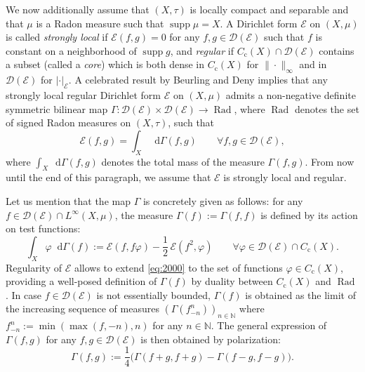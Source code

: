 \documentclass[10pt]{amsart}
\newcommand{\rmc}{\mathrm{c}}
\theoremstyle{plain}
\theoremstyle{definition}
\newcommand{\setN}{\mathbb{N}}
\newcommand{\cE}{\mathcal{E}}
\newcommand{\cD}{\mathcal{D}}
\let\phi\varphi
\DeclareMathOperator{\Rad}{Rad}
\newcommand{\di}{\mathop{}\!\mathrm{d}}
\DeclareMathOperator{\supp}{supp}
\begin{document}
We now additionally assume that $(X,\tau)$ is locally compact and separable and that $\mu$ is a Radon measure such that $\supp \mu = X$. A Dirichlet form $\cE$ on $(X,\mu)$ is called \textit{strongly local} if $\cE(f,g)=0$ for any $f, g \in \cD(\cE)$ such that $f$ is constant on a neighborhood of $\supp g$, and \textit{regular} if $C_\rmc(X) \cap \cD(\cE)$ contains a subset (called a \textit{core}) which is both dense in $C_\rmc(X)$ for $\|\cdot\|_{\infty}$ and in $\cD(\cE)$ for $|\cdot|_\cE$. A celebrated result by Beurling and Deny \cite{BeurlingDeny} implies that any strongly local regular Dirichlet form $\cE$ on $(X,\mu)$ admits a non-negative definite symmetric bilinear map $\Gamma: \cD(\cE) \times \cD(\cE) \to \Rad$, where $\Rad$ denotes the set of signed Radon measures on $(X,\tau)$, such that
\[
\cE(f,g) = \int_X \di \Gamma(f,g) \qquad \forall f,g \in \cD(\cE),
\]
where $\int_X \di \Gamma(f,g)$ denotes the total mass of the measure $\Gamma(f,g)$. From now until the end of this paragraph, we assume that $\cE$ is strongly local and regular.

Let us mention that the map $\Gamma$ is concretely given as follows: for any $f \in \cD(\cE) \cap L^\infty(X,\mu)$, the measure $\Gamma(f):=\Gamma(f,f)$ is defined by its action on test functions:
\begin{equation}\label{eq:2000}
\int_X \phi \di \Gamma(f):= \cE(f,f\phi) - \frac{1}{2}\,\cE(f^2, \phi) \qquad \forall \phi \in \cD(\cE) \cap C_\rmc(X).
\end{equation}
Regularity of $\cE$ allows to extend \eqref{eq:2000} to the set of functions $\phi \in C_\rmc(X)$, providing a well-posed definition of $\Gamma(f)$ by duality between $C_\rmc(X)$ and $\Rad$. In case $f \in \cD(\cE)$ is not essentially bounded, $\Gamma(f)$ is obtained as the limit of the increasing sequence of measures $(\Gamma(f_{-n}^{n}))_{n\in\setN}$ where $f_{-n}^n:=\min(\max(f,-n),n)$ for any $n \in \setN$. The general expression of $\Gamma(f,g)$ for any $f,g \in \cD(\cE)$ is then obtained by polarization:
\[
\Gamma(f,g):= \frac{1}{4}\bigl(\Gamma(f+g,f+g) - \Gamma(f-g,f-g)\bigr).
\]
\end{document}
